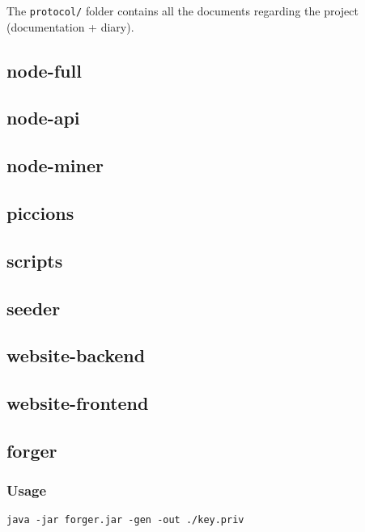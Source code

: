 \documentclass[../documentation.tex]{subfiles}
\begin{document}
The \texttt{protocol/} folder contains all the documents regarding
the project (documentation + diary).

\subsection{node-full}
\subsection{node-api}
\subsection{node-miner}


\subsection{piccions}


\subsection{scripts}


\subsection{seeder}


\subsection{website-backend}


\subsection{website-frontend}


\subsection{forger}

\subsubsection{Usage}

\begin{lstlisting}[style=generic]
java -jar forger.jar -gen -out ./key.priv
\end{lstlisting}
\end{document}

